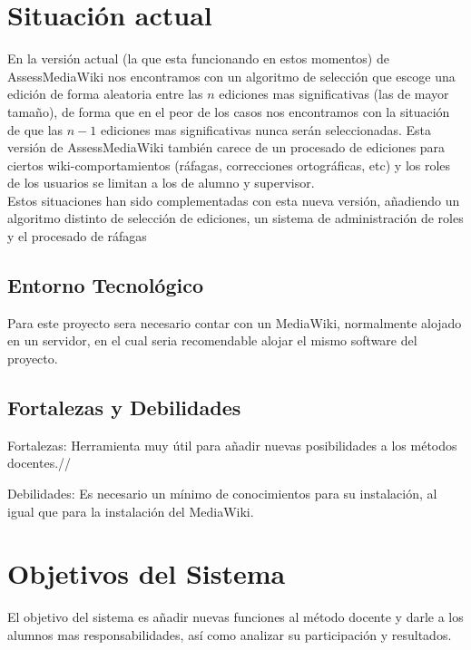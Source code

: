 


\section{Situación actual} 
En la versión actual (la que esta funcionando en estos momentos) de AssessMediaWiki nos encontramos con un algoritmo de selección que escoge una edición de forma aleatoria entre las $n$ ediciones mas significativas (las de mayor tamaño), de forma que en el peor de los casos nos encontramos con la situación de que las $n-1$ ediciones mas significativas nunca serán seleccionadas.
\newline
Esta versión de AssessMediaWiki también carece de un procesado de ediciones para ciertos wiki-comportamientos (ráfagas, correcciones ortográficas, etc) y los roles de los usuarios se limitan a los de alumno y supervisor.\\
Estos situaciones han sido complementadas con esta nueva versión, añadiendo un algoritmo distinto de selección de ediciones, un sistema de administración de roles y el procesado de ráfagas

\subsection{Entorno Tecnológico}
Para este proyecto sera necesario contar con un MediaWiki, normalmente alojado en un servidor, en el cual seria recomendable alojar el mismo software del proyecto.

\subsection{Fortalezas y Debilidades}
Fortalezas: Herramienta muy útil para añadir nuevas posibilidades a los métodos docentes.//

Debilidades: Es necesario un mínimo de conocimientos para su instalación, al igual que para la instalación del MediaWiki.

\section{Objetivos del Sistema}
El objetivo del sistema es añadir nuevas funciones al método docente y darle a los alumnos mas responsabilidades, así como analizar su participación y resultados.

